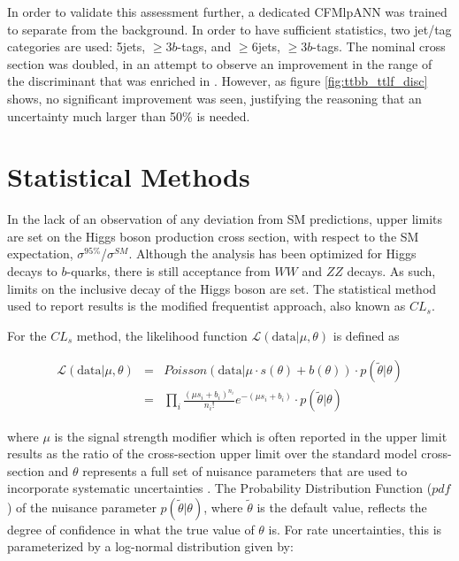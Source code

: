 \begin{description}
    In order to validate this assessment further, a dedicated CFMlpANN
    was trained to separate \ttbb from the \ttjets background.  In
    order to have sufficient statistics, two jet/tag categories are
    used: 5jets, $\ge$3$b$-tags, and $\ge$6jets, $\ge$3$b$-tags.  The
    nominal \ttbb cross section was doubled, in an attempt to observe
    an improvement in the range of the discriminant that was enriched
    in \ttbb.  However, as figure \ref{fig:ttbb_ttlf_disc} shows, no
    significant improvement was seen, justifying the reasoning that an
    uncertainty much larger  than 50\% is needed.  

\end{description}

\section{Statistical Methods}
\label{statistical_methods_overview}

\par In the lack of an observation of any deviation from SM
predictions, upper limits are set on the Higgs boson production cross
section, with respect to the SM expectation,
$\sigma^{95\%}$/$\sigma^{SM}$. Although the analysis has been
optimized for Higgs decays to $b$-quarks, there is still acceptance
from $WW$ and $ZZ$ decays.  As such, limits on the inclusive decay of
the Higgs boson are set.  The statistical method used to report
results is the modified frequentist approach, also known as
$CL_{s}$.

\par For the $CL_{s}$ method, the likelihood function
$\mathcal{L}(\mathrm{data}|\mu,\theta)$ is defined as  

\begin{eqnarray}\label{eq:Likelihood}
\mathcal{L}(\mathrm{data}|\mu,\theta)      & = & Poisson(\mathrm{data}|\mu \cdot s(\theta) + b(\theta)) \cdot p(\tilde{\theta}|\theta)  \\  
   								& = & \prod_{i} \frac{(\mu s_{i} + b_{i})^{n_{i}}}{n_{i}!} e^{-(\mu s_{i}+b_{i}) }  \cdot p(\tilde{\theta}|\theta) 
\end{eqnarray}

\noindent where $\mu$ is the signal strength modifier which is often
reported in the upper limit results as the ratio of the cross-section
upper limit over the standard model cross-section and $\theta$
represents a full set of nuisance parameters that are used to
incorporate systematic uncertainties \cite{CMS-NOTE-2011-005}.  
The Probability Distribution Function ($pdf$) of the nuisance parameter
$p(\tilde{\theta}|\theta)$, where $\tilde{\theta}$ is the default
value, reflects the degree of confidence in what the true value of
$\theta$ is.  For rate uncertainties, this is parameterized by a
log-normal distribution given by:

